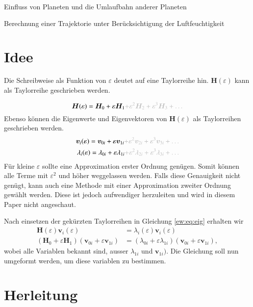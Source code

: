 Einfluss von Planeten und die Umlaufbahn anderer Planeten

Berechnung einer Trajektorie unter Berücksichtigung der Luftfeuchtigkeit %

\section{Idee}

Die Schreibweise als Funktion von $\varepsilon$ deutet auf eine Taylorreihe hin. 
$\bm H(\varepsilon)$ kann als Taylorreihe geschrieben werden.

\begin{equation*}
    \bm H(\varepsilon) = \bm H_0 + \varepsilon \bm H_1 \GR{ + \varepsilon^2 \bm H_2  + \varepsilon^3 \bm H_3 + \dots}
\end{equation*}
Ebenso können die Eigenwerte und Eigenvektoren von $\bm H(\varepsilon)$ als Taylorreihen geschrieben werden.
\begin{align}
    \bm v_i(\varepsilon) = \bm v_{0i} + \varepsilon \bm v_{1i} \GR{ + \varepsilon^2 \bm v_{2i}  + \varepsilon^3 \bm v_{3i} + \dots} \label{ew:eq:eigvec} \\
    \lambda_i(\varepsilon) = \lambda_{0i} + \varepsilon \lambda_{1i} \GR{ + \varepsilon^2 \lambda_{2i}  + \varepsilon^3 \lambda_{3i} + \dots}  \label{ew:eq:eigval}
\end{align}
Für kleine $\varepsilon$ sollte eine Approximation erster Ordnung genügen.
Somit können alle Terme mit $\varepsilon^2$ und höher weggelassen werden.
Falls diese Genauigkeit nicht genügt, kann auch eine Methode mit einer Approximation zweiter Ordnung gewählt werden.
Diese ist jedoch aufwendiger herzuleiten und wird in diesem Paper nicht angeschaut.

Nach einsetzen der gekürzten Taylorreihen in Gleichung \ref{ew:eq:eig} erhalten wir 
\begin{align}
    \bm H(\varepsilon) \bm v_i(\varepsilon)
    &=
    \lambda_i(\varepsilon) \bm v_i(\varepsilon) \\
    (\bm H_0 + \varepsilon \bm H_1)
    (\bm v_{0i} + \varepsilon \bm v_{1i})
    &=
    (\lambda_{0i} + \varepsilon \lambda_{1i})
    (\bm v_{0i} + \varepsilon \bm v_{1i}),
\end{align}
wobei alle Variablen bekannt sind, ausser $\lambda_{1i}$ und $\bm v_{1i})$.
Die Gleichung soll nun umgeformt werden, um diese variablen zu bestimmen.

\section{Herleitung}

